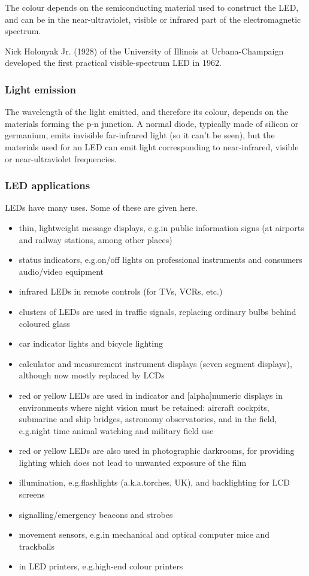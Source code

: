 The colour depends on the semiconducting material used to construct the LED, and can be in the near-ultraviolet, visible or infrared part of the electromagnetic spectrum.
 
\begin{IFact}{Nick Holonyak Jr. (1928) of the University of Illinois at Urbana-Champaign developed the first practical visible-spectrum LED in 1962.}
\end{IFact}

\subsubsection{Light emission}
The wavelength of the light emitted, and therefore its colour, depends on the materials forming the p-n junction. A normal diode, typically made of silicon or germanium, emits invisible far-infrared light (so it can't be seen), but the materials used for an LED can emit light corresponding to near-infrared, visible or near-ultraviolet frequencies.

\subsubsection{LED applications}
LEDs have many uses.  Some of these are given here.
\begin{itemize}
\item thin, lightweight message displays, e.g.\@ in public information signs (at airports and railway stations, among other places)
\item status indicators, e.g.\@ on/off lights on professional instruments and consumers audio/video equipment
\item infrared LEDs in remote controls (for TVs, VCRs, etc.)
\item clusters of LEDs are used in traffic signals, replacing ordinary bulbs behind coloured glass
\item car indicator lights and bicycle lighting
\item calculator and measurement instrument displays (seven segment displays), although now mostly replaced by LCDs
\item red or yellow LEDs are used in indicator and [alpha]numeric displays in environments where night vision must be retained: aircraft cockpits, submarine and ship bridges, astronomy observatories, and in the field, e.g.\@ night time animal watching and military field use
\item red or yellow LEDs are also used in photographic darkrooms, for providing lighting which does not lead to unwanted exposure of the film
\item illumination, e.g.\@ flashlights (a.k.a.\@ torches, UK), and backlighting for LCD screens
\item signalling/emergency beacons and strobes
\item movement sensors, e.g.\@ in mechanical and optical computer mice and trackballs
\item in LED printers, e.g.\@ high-end colour printers
\end{itemize}

